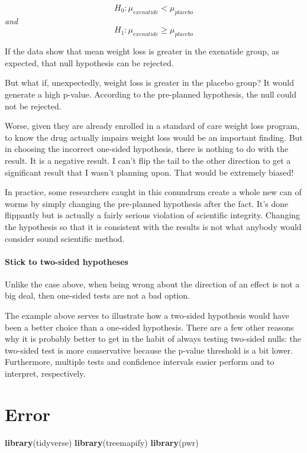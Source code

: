 \documentclass[]{book}
\newenvironment{Shaded}{\begin{snugshade}}{\end{snugshade}}
\newcommand{\KeywordTok}[1]{\textcolor[rgb]{0.13,0.29,0.53}{\textbf{#1}}}
\newcommand{\NormalTok}[1]{#1}
\begin{document}
\[H_0:\mu_{exenatide}<\mu_{placebo}\] \emph{and} \[H_1: \mu_{exenatide}\ge\mu_{placebo}\]

If the data show that mean weight loss is greater in the exenatide group, as expected, that null hypothesis can be rejected.

But what if, unexpectedly, weight loss is greater in the placebo group? It would generate a high p-value. According to the pre-planned hypothesis, the null could not be rejected.

Worse, given they are already enrolled in a standard of care weight loss program, to know the drug actually impairs weight loss would be an important finding. But in choosing the incorrect one-sided hypothesis, there is nothing to do with the result. It is a negative result. I can't flip the tail to the other direction to get a significant result that I wasn't planning upon. That would be extremely biased!

In practice, some researchers caught in this conundrum create a whole new can of worms by simply changing the pre-planned hypothesis after the fact. It's done flippantly but is actually a fairly serious violation of scientific integrity. Changing the hypothesis so that it is consistent with the results is not what anybody would consider sound scientific method.

\hypertarget{stick-to-two-sided-hypotheses}{%
\subsubsection{Stick to two-sided hypotheses}\label{stick-to-two-sided-hypotheses}}

Unlike the case above, when being wrong about the direction of an effect is not a big deal, then one-sided tests are not a bad option.

The example above serves to illustrate how a two-sided hypothesis would have been a better choice than a one-sided hypothesis. There are a few other reasons why it is probably better to get in the habit of always testing two-sided nulls: the two-sided test is more conservative because the p-value threshold is a bit lower. Furthermore, multiple tests and confidence intervals easier perform and to interpret, respectively.

\hypertarget{error}{%
\chapter{Error}\label{error}}

\begin{Shaded}
\begin{Highlighting}[]
\KeywordTok{library}\NormalTok{(tidyverse)}
\KeywordTok{library}\NormalTok{(treemapify)}
\KeywordTok{library}\NormalTok{(pwr)}
\end{Highlighting}
\end{Shaded}
\end{document}
